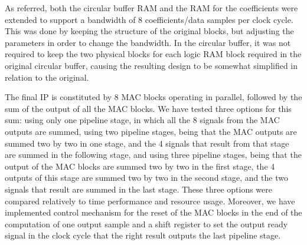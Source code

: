 \documentclass[12pt]{article}
\begin{document}
As referred, both the circular buffer RAM and the RAM for the coefficients were extended to support
a bandwidth of 8 coefficients/data samples per clock cycle. This was done by keeping the structure
of the original blocks, but adjusting the parameters in order to change the bandwidth. In the
circular buffer, it was not required to keep the two physical blocks for each logic RAM block
required in the original circular buffer, causing the resulting design to be somewhat simplified in
relation to the original.

The final IP is constituted by 8 MAC blocks operating in parallel, followed by the sum of the output
of all the MAC blocks. We have tested three options for this sum: using only one pipeline stage, in
which all the 8 signals from the MAC outputs are summed, using two pipeline stages, being that the
MAC outputs are summed two by two in one stage, and the 4 signals that result from that stage are
summed in the following stage, and using three pipeline stages, being that the output of the MAC
blocks are summed two by two in the first stage, the 4 outputs of this stage are summed two by two
in the second stage, and the two signals that result are summed in the last stage. These three
options were compared relatively to time performance and resource usage. Moreover, we have
implemented control mechanism for the reset of the MAC blocks in the end of the computation of one
output sample and a shift register to set the output ready signal in the clock cycle that the right
result outputs the last pipeline stage.
\end{document}
